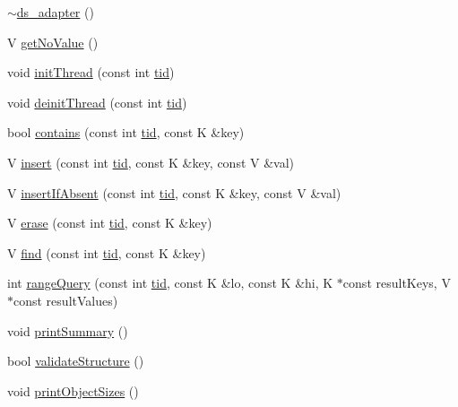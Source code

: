 \begin{DoxyCompactItemize}
\item 
\hyperlink{classds__adapter_a366f46dd39d59f2d4a147589f5fd98e3}{$\sim$ds\+\_\+adapter} ()
\item 
V \hyperlink{classds__adapter_a9e1e4aec136b351d1a6820d70484a6c5}{get\+No\+Value} ()
\item 
void \hyperlink{classds__adapter_a3733f6a6b57312b1b5e4fb5181d82a0b}{init\+Thread} (const int \hyperlink{microbench_2main_8cpp_a9ca9869868fe7e7a38a921cc7de4103f}{tid})
\item 
void \hyperlink{classds__adapter_a173ca48b19fc1dc346159ea582c690cd}{deinit\+Thread} (const int \hyperlink{microbench_2main_8cpp_a9ca9869868fe7e7a38a921cc7de4103f}{tid})
\item 
bool \hyperlink{classds__adapter_aecf1899dbe9fae93c72ee2b5549cf6eb}{contains} (const int \hyperlink{microbench_2main_8cpp_a9ca9869868fe7e7a38a921cc7de4103f}{tid}, const K \&key)
\item 
V \hyperlink{classds__adapter_a6c0fc676d77e30e14946baf325174739}{insert} (const int \hyperlink{microbench_2main_8cpp_a9ca9869868fe7e7a38a921cc7de4103f}{tid}, const K \&key, const V \&val)
\item 
V \hyperlink{classds__adapter_ae9cb29ad0c0338c0e1d12ef97e008135}{insert\+If\+Absent} (const int \hyperlink{microbench_2main_8cpp_a9ca9869868fe7e7a38a921cc7de4103f}{tid}, const K \&key, const V \&val)
\item 
V \hyperlink{classds__adapter_a1bf459e8449df93cc738a644aeffdcfb}{erase} (const int \hyperlink{microbench_2main_8cpp_a9ca9869868fe7e7a38a921cc7de4103f}{tid}, const K \&key)
\item 
V \hyperlink{classds__adapter_a0109b0d011810f687c9e9273eb1d1bc8}{find} (const int \hyperlink{microbench_2main_8cpp_a9ca9869868fe7e7a38a921cc7de4103f}{tid}, const K \&key)
\item 
int \hyperlink{classds__adapter_a23a9c8db5425e98a93d647df1c6c23dd}{range\+Query} (const int \hyperlink{microbench_2main_8cpp_a9ca9869868fe7e7a38a921cc7de4103f}{tid}, const K \&lo, const K \&hi, K $\ast$const result\+Keys, V $\ast$const result\+Values)
\item 
void \hyperlink{classds__adapter_aac97293215557665d2ef1e1a0d06fcfd}{print\+Summary} ()
\item 
bool \hyperlink{classds__adapter_ae50fe8a8683c0278cdd4c45e1405860d}{validate\+Structure} ()
\item 
void \hyperlink{classds__adapter_a33b13b7059a8c0345fb59a324dc3a691}{print\+Object\+Sizes} ()
\item 

\end{DoxyCompactItemize}
